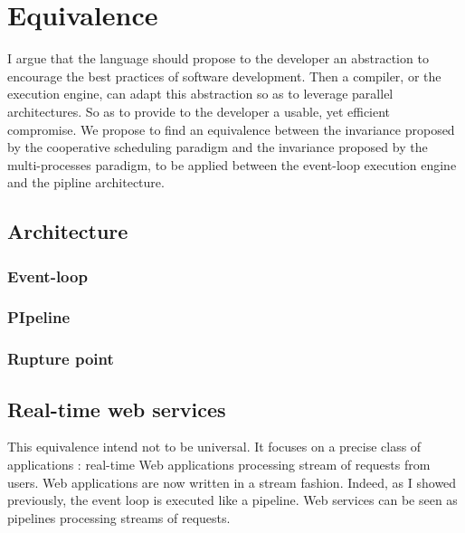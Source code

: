 \section{Equivalence}





I argue that the language should propose to the developer an abstraction to encourage the best practices of software development.
Then a compiler, or the execution engine, can adapt this abstraction so as to leverage parallel architectures. 
So as to provide to the developer a usable, yet efficient compromise.
We propose to find an equivalence between the invariance proposed by the cooperative scheduling paradigm and the invariance proposed by the multi-processes paradigm, to be applied between the event-loop execution engine and the pipline architecture.




\subsection{Architecture}


\subsubsection{Event-loop}

\subsubsection{PIpeline}


\subsubsection{Rupture point}




\subsection{Real-time web services}


This equivalence intend not to be universal.
It focuses on a precise class of applications : real-time Web applications processing stream of requests from users.
Web applications are now written in a stream fashion.
Indeed, as I showed previously, the event loop is executed like a pipeline.
Web services can be seen as pipelines processing streams of requests.

